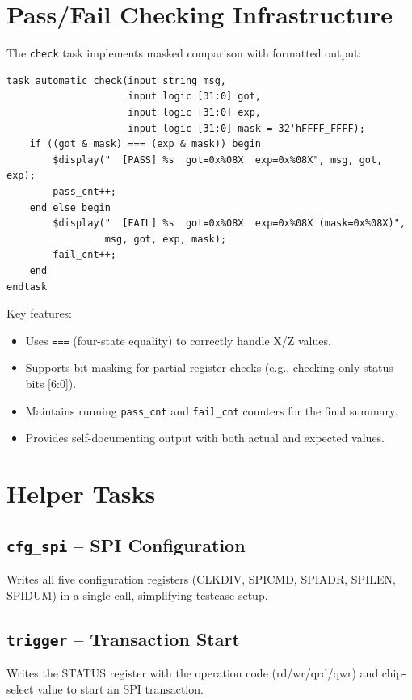 \section{Pass/Fail Checking Infrastructure}

The \texttt{check} task implements masked comparison with formatted output:
\begin{lstlisting}
task automatic check(input string msg,
                     input logic [31:0] got,
                     input logic [31:0] exp,
                     input logic [31:0] mask = 32'hFFFF_FFFF);
    if ((got & mask) === (exp & mask)) begin
        $display("  [PASS] %s  got=0x%08X  exp=0x%08X", msg, got, exp);
        pass_cnt++;
    end else begin
        $display("  [FAIL] %s  got=0x%08X  exp=0x%08X (mask=0x%08X)",
                 msg, got, exp, mask);
        fail_cnt++;
    end
endtask
\end{lstlisting}

Key features:
\begin{itemize}[leftmargin=2em]
  \item Uses \texttt{===} (four-state equality) to correctly handle X/Z values.
  \item Supports bit masking for partial register checks (e.g., checking only status bits [6:0]).
  \item Maintains running \texttt{pass\_cnt} and \texttt{fail\_cnt} counters for the final summary.
  \item Provides self-documenting output with both actual and expected values.
\end{itemize}

\section{Helper Tasks}

\subsection{\texttt{cfg\_spi} -- SPI Configuration}

Writes all five configuration registers (CLKDIV, SPICMD, SPIADR, SPILEN, SPIDUM) in a single
call, simplifying testcase setup.

\subsection{\texttt{trigger} -- Transaction Start}

Writes the STATUS register with the operation code (rd/wr/qrd/qwr) and chip-select value to
start an SPI transaction.

